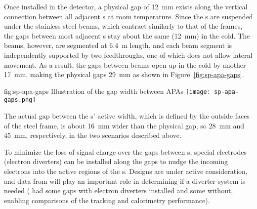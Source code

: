 

Once installed in the detector, a physical gap of \SI{12}{mm} exists along the vertical connection between all adjacent s at room temperature. Since the s are suspended under the stainless steel  beams, which contract similarly to that of the  frames, the gaps between most adjacent s stay about the same (\SI{12}{mm}) in the cold.  The  beams, however, are segmented at \SI{6.4}{m} length, and each beam segment is independently supported by two  feedthroughs, one of which does not allow lateral movement.  As a result, the gaps between  beams open up in the cold by another \SI{17}{mm},  %
making the physical gaps \SI{29}{mm} as shown in Figure~\ref{fig:sp-apa-gaps}.

\begin{dunefigure}{fig:sp-apa-gaps}
{Illustration of the gap width between APAs}  
\texttt{[image: sp-apa-gaps.png]} 
\end{dunefigure}

The actual gap between the s' active width, which is defined by the outside faces of the steel frame, is about \SI{16}{mm} wider than the physical gap, so \SI{28}{mm} and \SI{45}{mm}, respectively, in the two scenarios described above.

To minimize the loss of signal charge over the gaps between s, special electrodes (electron diverters) can be installed along the gaps to nudge the incoming electrons into the active regions of the s.  Designs are under active consideration, and data from  will play an important role in determining if a diverter system is needed ( had some  gaps with electron diverters installed and some without, enabling comparisons of the tracking and calorimetry performance).

